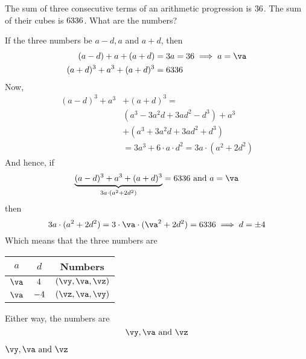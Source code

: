 



\DIVIDE{}\va
\SUBTRACT\va\vd\vy
\ADD\va\vd\vz

\question[3] The sum of three consecutive terms of an arithmetic progression is $36$. 
The sum of their cubes is $6336$. What are the numbers?

\watchout

\begin{solution}[\halfpage]
  If the three numbers be $a-d, a$ and $a+d$, then 
  \begin{align}
    (a-d) + a + (a+d) &= 3a = \vs\implies a = \va\\
    (a+d)^3 + a^3 + (a+d)^3 &= \vc
  \end{align}
  Now, 
  \begin{align}
    (a-d)^3 + a^3 &+ (a+d)^3 = \nonumber \\
                  &(a^3-3a^2 d + 3ad^2 - d^3) + a^3 \nonumber \\
                  &+ (a^3+3a^2 d+3ad^2+d^3) \\
                  &= 3a^3 + 6\cdot a\cdot d^2 = 3a\cdot( a^2 + 2d^2)  
  \end{align}
  And hence, if 
  \[ \underbrace{(a-d)^3 + a^3 + (a+d)^3}_{3a\cdot(a^2+2d^2)} = \vc\text{ and } a = \va \]
  then 
  \[ 3a\cdot(a^2+2d^2) = 3\cdot\va\cdot(\va^2 + 2d^2) = \vc\implies d = \pm\vd \] 
  Which means that the three numbers are 

  \begin{tabular}{c c c}
    \toprule
      $a$ & $d$ & Numbers \\ 
    \midrule
      $\va$ & $4$ & $(\vy,\va,\vz)$ \\
      $\va$ & $-4$ & $(\vz,\va,\vy)$ \\
    \bottomrule
  \end{tabular}

  Either way, the numbers are
  \[ \vy, \va\text{ and } \vz \]
\end{solution}
\ifprintanswers\begin{codex}
  $\vy, \va\text{ and } \vz$
\end{codex}\fi
